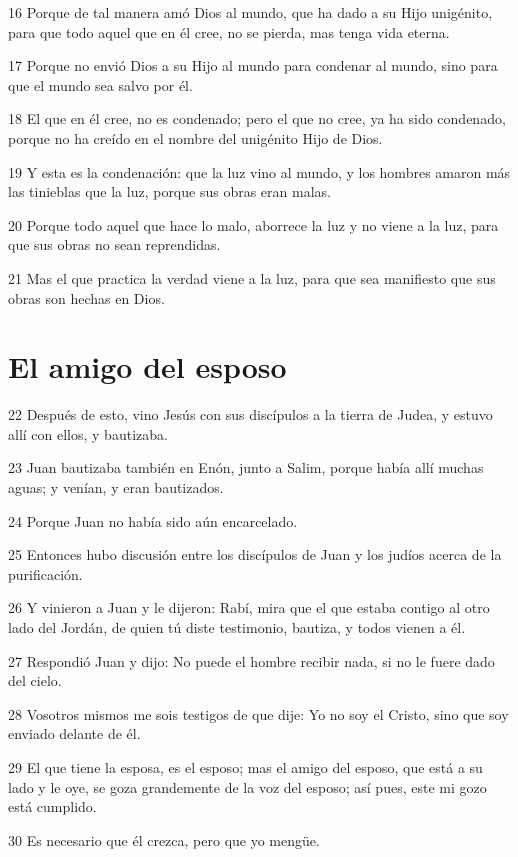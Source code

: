 \par 16 Porque de tal manera amó Dios al mundo, que ha dado a su Hijo unigénito, para que todo aquel que en él cree, no se pierda, mas tenga vida eterna.
\par 17 Porque no envió Dios a su Hijo al mundo para condenar al mundo, sino para que el mundo sea salvo por él.
\par 18 El que en él cree, no es condenado; pero el que no cree, ya ha sido condenado, porque no ha creído en el nombre del unigénito Hijo de Dios.
\par 19 Y esta es la condenación: que la luz vino al mundo, y los hombres amaron más las tinieblas que la luz, porque sus obras eran malas.
\par 20 Porque todo aquel que hace lo malo, aborrece la luz y no viene a la luz, para que sus obras no sean reprendidas.
\par 21 Mas el que practica la verdad viene a la luz, para que sea manifiesto que sus obras son hechas en Dios.

\section*{El amigo del esposo}

\par 22 Después de esto, vino Jesús con sus discípulos a la tierra de Judea, y estuvo allí con ellos, y bautizaba.
\par 23 Juan bautizaba también en Enón, junto a Salim, porque había allí muchas aguas; y venían, y eran bautizados.
\par 24 Porque Juan no había sido aún encarcelado.
\par 25 Entonces hubo discusión entre los discípulos de Juan y los judíos acerca de la purificación.
\par 26 Y vinieron a Juan y le dijeron: Rabí, mira que el que estaba contigo al otro lado del Jordán, de quien tú diste testimonio, bautiza, y todos vienen a él.
\par 27 Respondió Juan y dijo: No puede el hombre recibir nada, si no le fuere dado del cielo.
\par 28 Vosotros mismos me sois testigos de que dije: Yo no soy el Cristo, sino que soy enviado delante de él.
\par 29 El que tiene la esposa, es el esposo; mas el amigo del esposo, que está a su lado y le oye, se goza grandemente de la voz del esposo; así pues, este mi gozo está cumplido.
\par 30 Es necesario que él crezca, pero que yo mengüe.

